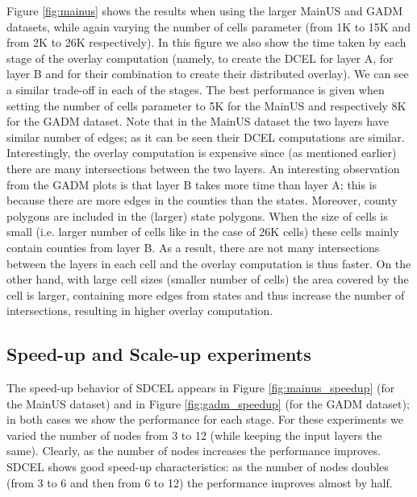 Figure \ref{fig:mainus} shows the results when using the larger MainUS and GADM datasets, while again varying the number of cells parameter (from 1K to 15K and from 2K to 26K respectively). In this figure we also show the time taken by each stage of the overlay computation (namely, to create the DCEL for layer A, for layer B and for their combination to create their distributed overlay). 
We can see a similar trade-off in each of the stages.  The best performance is given when setting the number of cells parameter to 5K for the MainUS and respectively 8K  for the GADM dataset.  
Note that in the MainUS dataset the two layers have similar number of edges; as it can be seen their DCEL computations are similar. 
Interestingly, the overlay computation is expensive since (as mentioned earlier) there are many intersections between the two layers.
An interesting observation from the GADM plots is that layer B takes more time than layer A; this is because there are more edges in the counties than the states. Moreover, county polygons are included in the (larger) state polygons. 
When the size of cells is small (i.e. larger number of cells like in the case of 26K cells) these cells mainly contain counties from layer B. As a result, there are not many intersections between the layers in each cell and the overlay computation is thus faster. 
On the other hand, with large cell sizes (smaller number of cells) the area covered by the cell is larger, containing more edges from states and thus increase the number of intersections, resulting in higher overlay computation.

\subsection{Speed-up and Scale-up experiments}

The speed-up behavior of SDCEL appears in Figure \ref{fig:mainus_speedup} (for the MainUS dataset) and in Figure \ref{fig:gadm_speedup} (for the GADM dataset); in both cases we show the performance for each stage. For these experiments we varied the number of nodes from 3 to 12 (while keeping the input layers the same).
Clearly, as the number of nodes increases the performance improves. 
SDCEL shows good speed-up characteristics: as the number of nodes doubles (from 3 to 6 and then from 6 to 12) the performance improves almost by half. 

